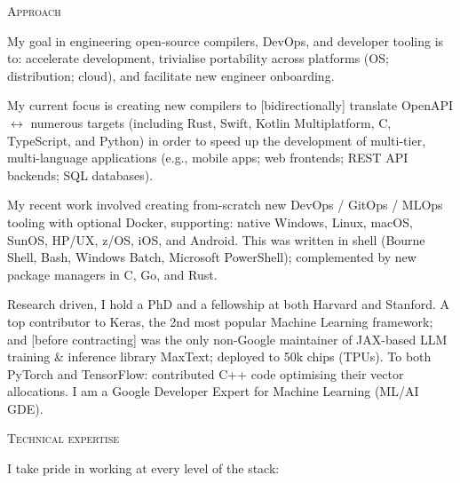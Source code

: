 \documentclass[11pt, a4paper]{article}
\newcommand{\headright}[1]{\vspace*{2.5ex}\textsc{\Large\color{cvblue}#1}\par%
     \vspace*{-2ex}{\color{cvblue}\hrulefill}\par}
\begin{document}
\begin{minipage}[t]{0.56\textwidth}
\setlength{\parskip}{0.8ex}%

\vspace{2ex}
\hypersetup{urlcolor=black}
\hypersetup{linkcolor=black}

\headright{Approach}
My goal in engineering open-source compilers, DevOps, and developer tooling is to: accelerate development, trivialise portability across platforms (OS; distribution; cloud), and facilitate new engineer onboarding.

My current focus is creating new compilers to [bidirectionally] translate OpenAPI \(\leftrightarrow\) numerous targets (including Rust, Swift, Kotlin Multiplatform, C, TypeScript, and Python) in order to speed up the development of multi-tier, multi-language applications (e.g., mobile apps; web frontends; REST API backends; SQL databases).

My recent work involved creating from-scratch new DevOps / GitOps / MLOps tooling with optional Docker, supporting: native Windows, Linux, macOS, SunOS, HP/UX, z/OS, iOS, and Android.  This was written in shell (Bourne Shell, Bash, Windows Batch, Microsoft PowerShell); complemented by new package managers in C, Go, and Rust.

Research driven, I hold a PhD and a fellowship at both Harvard and Stanford. A top contributor to Keras, the 2nd most popular Machine Learning framework; and [before contracting] was the only non-Google maintainer of JAX-based LLM training \& inference library MaxText; deployed to 50k chips (TPUs). To both PyTorch and TensorFlow: contributed C++ code optimising their vector allocations. I am a Google Developer Expert for Machine Learning (ML/AI GDE).

\headright{Technical expertise}
I take pride in working at every level of the stack:


\end{minipage}
\end{document}
